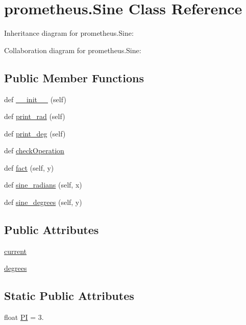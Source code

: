 \hypertarget{classprometheus_1_1_sine}{}\section{prometheus.\+Sine Class Reference}
\label{classprometheus_1_1_sine}


Inheritance diagram for prometheus.\+Sine\+:


Collaboration diagram for prometheus.\+Sine\+:
\subsection*{Public Member Functions}
\begin{DoxyCompactItemize}
\item 
def \hyperlink{classprometheus_1_1_sine_af35f85da2adae94d407369a36a5df279}{\+\_\+\+\_\+init\+\_\+\+\_\+} (self)
\item 
def \hyperlink{classprometheus_1_1_sine_a4f6ce83bb5d26de686db0c71e86b5a36}{print\+\_\+rad} (self)
\item 
def \hyperlink{classprometheus_1_1_sine_a097f9621a82f235edc45b5749ca0d74e}{print\+\_\+deg} (self)
\item 
def \hyperlink{classprometheus_1_1_sine_a0226a8675eb2c107f61534bab5fa8b8f}{check\+Operation}
\item 
def \hyperlink{classprometheus_1_1_sine_a1dfebb4deff04ae55ab5706eaf5e2b44}{fact} (self, y)
\item 
def \hyperlink{classprometheus_1_1_sine_a2db3bb19693275b022d26d6ad1f03fa8}{sine\+\_\+radians} (self, x)
\item 
def \hyperlink{classprometheus_1_1_sine_a452be228e4424a58f6559272de35cebd}{sine\+\_\+degrees} (self, y)
\end{DoxyCompactItemize}
\subsection*{Public Attributes}
\begin{DoxyCompactItemize}
\item 
\hyperlink{classprometheus_1_1_sine_a4cb8c14c2b41b230aa738d8ab7595c7c}{current}
\item 
\hyperlink{classprometheus_1_1_sine_abe0819a405246a75d63d6ec7ef4bd4a1}{degrees}
\end{DoxyCompactItemize}
\subsection*{Static Public Attributes}
\begin{DoxyCompactItemize}
\item 
float \hyperlink{classprometheus_1_1_sine_a864cd812c3a2a3f45d8374ae067ec454}{P\+I} = 3.
\end{DoxyCompactItemize}



